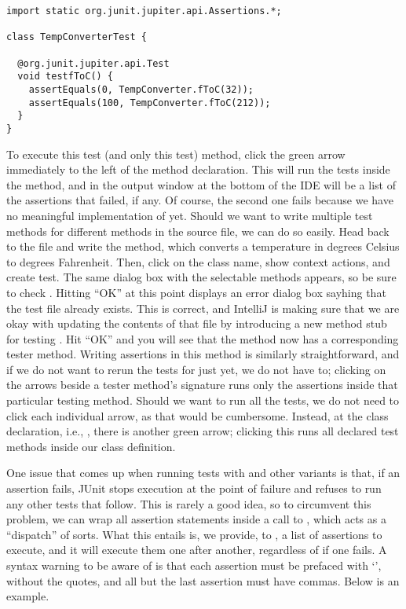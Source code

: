 \begin{lstlisting}[language=MyJava]
import static org.junit.jupiter.api.Assertions.*;

class TempConverterTest {

  @org.junit.jupiter.api.Test
  void testfToC() {
    assertEquals(0, TempConverter.fToC(32));
    assertEquals(100, TempConverter.fToC(212));
  }
}
\end{lstlisting}

To execute this test (and only this test) method, click the green arrow immediately to the left of the method declaration. This will run the tests inside the method, and in the output window at the bottom of the IDE will be a list of the assertions that failed, if any. Of course, the second one fails because we have no meaningful implementation of  yet. Should we want to write multiple test methods for different methods in the source file, we can do so easily. Head back to the  file and write the  method, which converts a temperature in degrees Celsius to degrees Fahrenheit. Then, click on the class name, show context actions, and create test. The same dialog box with the selectable methods appears, so be sure to check . Hitting ``OK'' at this point displays an error dialog box sayhing that the test file already exists. This is correct, and IntelliJ is making sure that we are okay with updating the contents of that file by introducing a new method stub for testing . Hit ``OK'' and you will see that the  method now has a corresponding tester method. Writing assertions in this method is similarly straightforward, and if we do not want to rerun the tests for  just yet, we do not have to; clicking on the arrows beside a tester method's signature runs only the assertions inside that particular testing method. Should we want to run all the tests, we do not need to click each individual arrow, as that would be cumbersome. Instead, at the class declaration, i.e., , there is another green arrow; clicking this runs all declared test methods inside our class definition.

One issue that comes up when running tests with  and other variants is that, if an assertion fails, JUnit stops execution at the point of failure and refuses to run any other tests that follow. This is rarely a good idea, so to circumvent this problem, we can wrap all assertion statements inside a call to , which acts as a ``dispatch'' of sorts. What this entails is, we provide, to , a list of assertions to execute, and it will execute them one after another, regardless of if one fails. A syntax warning to be aware of is that each assertion must be prefaced with `\ttt{() -> }', without the quotes, and all but the last assertion must have commas. Below is an example.

